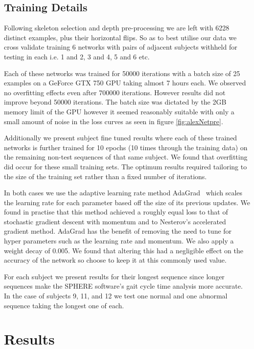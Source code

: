 \documentclass[11pt]{article} %
\begin{document}
\subsection{Training Details}


Following skeleton selection and depth pre-processing we are left with 6228 distinct examples, plus their horizontal flips. So as to best utilise our data we cross validate training 6 networks with pairs of adjacent subjects withheld for testing in each i.e. 1 and 2, 3 and 4, 5 and 6 etc. 

Each of these networks was trained for 50000 iterations with a batch size of 25 examples on a GeForce GTX 750 GPU taking almost 7 hours each. We observed no overfitting effects even after 700000 iterations. However results did not improve beyond 50000 iterations. The batch size was dictated by the 2GB memory limit of the GPU however it seemed reasonably suitable with only a small amount of noise in the loss curves as seen in figure \ref{fig:alexNetpre}.

Additionally we present subject fine tuned results where each of these trained networks is further trained for 10 epochs (10 times through the training data) on the remaining non-test sequences of that same subject. We found that overfitting did occur for these small training sets. The optimum results required tailoring to the size of the training set rather than a fixed number of iterations. 

In both cases we use the adaptive learning rate method AdaGrad~\cite{Duchi2011} which scales the learning rate for each parameter based off the size of its previous updates. We found in practise that this method achieved a roughly equal loss to that of stochastic gradient descent with momentum and to Nesterov's accelerated gradient method. AdaGrad has the benefit of removing the need to tune for hyper parameters such as the learning rate and momentum. We also apply a weight decay of 0.005. We found that altering this had a negligible effect on the accuracy of the network so choose to keep it at this commonly used value.

For each subject we present results for their longest sequence since longer sequences make the SPHERE software's gait cycle time analysis more accurate. In the case of subjects 9, 11, and 12 we test one normal and one abnormal sequence taking the longest one of each. 

\section{Results}
\end{document}
